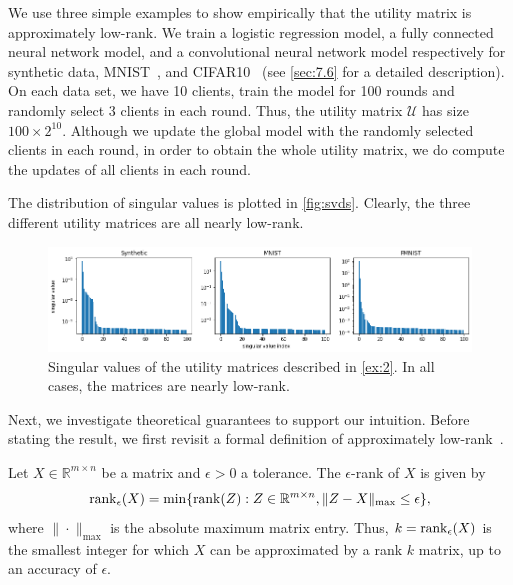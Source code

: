 \begin{example} \label{ex:2}
    We use three simple examples to show empirically that the utility matrix is approximately low-rank.  We train a logistic regression model, a fully connected neural network model, and a convolutional neural network model respectively for synthetic data, MNIST~\cite{lecun-mnisthandwrittendigit-2010}, and CIFAR10~\cite{Krizhevsky09learningmultiple} (see \autoref{sec:7.6} for a detailed description). On each data set, we have 10 clients, train the model for 100 rounds and randomly select 3 clients in each round. Thus, the utility matrix $\mathcal{U}$ has size $100\times 2^{10}$. Although we update the global model with the randomly selected clients in each round, in order to obtain the whole utility matrix, we do compute the updates of all clients in each round.
    
    The distribution of singular values is plotted in \autoref{fig:svds}. Clearly, the three different utility matrices are all nearly low-rank.

    \begin{figure}[t]
        \centering
        \includegraphics[width=\textwidth]{./figures/svds.png}
        \caption{Singular values of the utility matrices described in \autoref{ex:2}. In all cases, the matrices are nearly low-rank.}
        \label{fig:svds}
    \end{figure}

\end{example}

Next, we investigate theoretical guarantees to support our intuition. Before stating the result, we first revisit a formal definition of approximately low-rank~\cite{udell2019big}. 
\begin{definition}
    Let $X\in\mathbb{R}^{m\times n}$ be a matrix and $\epsilon>0$ a tolerance. The $\epsilon$-rank of $X$ is given by 
    \[\operatorname{rank}_{\epsilon}(X) = \min\{\operatorname{rank}(Z): Z\in\mathbb{R}^{m\times n}, \|Z - X\|_{\max} \leq \epsilon\},\]
    where $\|\cdot\|_{\max}$ is the absolute maximum matrix entry. Thus, $k = \operatorname{rank}_{\epsilon} (X)$ is the smallest integer for which $X$ can be approximated by a rank $k$ matrix, up to an accuracy of $\epsilon$.
\end{definition}

